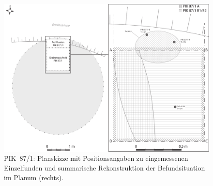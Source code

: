 \begin{figure}[tb]
 \centering
 \includegraphics[width=\textwidth]{fig/PIK87-1_Planum_Keramik.pdf}
 \caption{PIK~87/1: Planskizze mit Positionsangaben zu eingemessenen Einzelfunden und summarische Rekonstruktion der Befundsituation im Planum (rechts).}
 \label{fig:PIK87-1_PlanaSkizze}
\end{figure}

